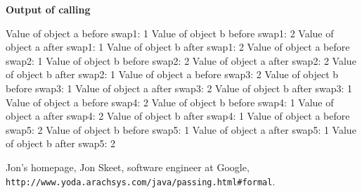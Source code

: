 \documentclass[5pt]{article}
\begin{document}
\textbf{Output of calling}\newline
\begin{sffamily}
\begin{scriptsize} 


Value of object a before swap1: 1\newline
Value of object b before swap1: 2\newline
Value of object a after swap1: 1\newline
Value of object b after swap1: 2\newline
\newline
Value of object a before swap2: 1\newline
Value of object b before swap2: 2\newline
Value of object a after swap2: 2\newline
Value of object b after swap2: 1\newline
\newline
Value of object a before swap3: 2\newline
Value of object b before swap3: 1\newline
Value of object a after swap3: 2\newline
Value of object b after swap3: 1\newline
\newline
Value of object a before swap4: 2\newline
Value of object b before swap4: 1\newline
Value of object a after swap4: 2\newline
Value of object b after swap4: 1\newline
\newline
Value of object a before swap5: 2\newline
Value of object b before swap5: 1\newline
Value of object a after swap5: 1\newline
Value of object b after swap5: 2\newline
\newline

\end{scriptsize}
\end{sffamily}
\begin{thebibliography}{1}

Jon's homepage, Jon Skeet, software engineer at Google,
\newline\verb|http://www.yoda.arachsys.com/java/passing.html#formal|.



\end{thebibliography}
\end{document}
